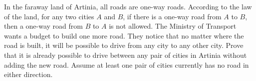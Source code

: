 In the faraway land of Artinia, all roads are one-way roads. According to the law of the land, for any two cities $A$ and $B$, if there is a one-way road from $A$ to $B$, then a one-way road from $B$ to $A$ is not allowed. The Ministry of Transport wants a budget to build one more road. They notice that no matter where the road is built, it will be possible to drive from any city to any other city. Prove that it is already possible to drive between any pair of cities in Artinia without adding the new road. Assume at least one pair of cities currently has no road in either direction.
